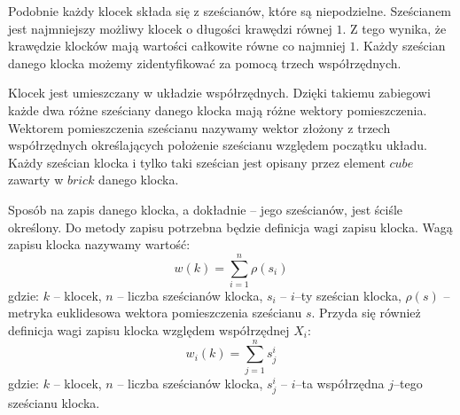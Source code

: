 \documentclass[12pt]{article}
\begin{document}
Podobnie każdy klocek składa się
z sześcianów, które są niepodzielne. Sześcianem jest najmniejszy możliwy
klocek o długości krawędzi równej $1$. Z tego wynika, że krawędzie klocków
mają wartości całkowite równe co najmniej $1$. Każdy sześcian danego
klocka możemy zidentyfikować za pomocą trzech współrzędnych.

Klocek jest
umieszczany w układzie współrzędnych. Dzięki takiemu zabiegowi każde dwa
różne sześciany danego klocka mają różne wektory pomieszczenia. Wektorem
pomieszczenia sześcianu nazywamy wektor złożony z trzech współrzędnych
określających położenie sześcianu względem początku układu. Każdy
sześcian klocka i tylko taki sześcian jest opisany przez element $cube$
zawarty w $brick$ danego klocka.

Sposób na zapis danego klocka, a dokładnie -- jego sześcianów, jest ściśle
określony. Do metody zapisu potrzebna będzie definicja wagi zapisu klocka.
Wagą zapisu klocka nazywamy wartość:
\begin{equation}
	w(k) = \sum_{i=1}^n \rho (s_i)
\end{equation}
gdzie:
$k$ -- klocek,
$n$ -- liczba sześcianów klocka,
$s_i$ -- $i$--ty sześcian klocka,
$\rho (s)$ -- metryka euklidesowa wektora pomieszczenia sześcianu $s$.
Przyda się również definicja wagi zapisu klocka względem współrzędnej
$X_i$:
\begin{equation}
	w_i(k) = \sum_{j=1}^n s_j^i
\end{equation}
gdzie:
$k$ -- klocek,
$n$ -- liczba sześcianów klocka,
$s_j^i$ -- $i$--ta współrzędna $j$--tego sześcianu klocka.
\end{document}
